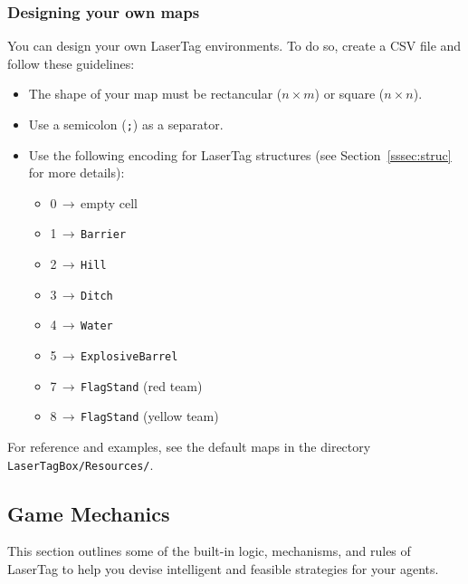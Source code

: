 \documentclass[a4paper,english,DIV=16,11pt,parskip=half,dvipsnames,listof=totoc,index=totoc,bibliography=totoc]{scrartcl}
\begin{document}
\subsubsection{Designing your own maps}
%
You can design your own LaserTag environments. To do so, create a CSV file and follow these guidelines:
%
\begin{itemize}
  \item The shape of your map must be rectancular ($n \times m$) or square ($n \times n$).
  \item Use a semicolon (\texttt{;}) as a separator.
  \item Use the following encoding for LaserTag structures (see Section~\ref{sssec:struc} for more details):
  \begin{itemize}
    \item 0$\,\to\,$empty cell
    \item 1$\,\to\,$\texttt{Barrier}
    \item 2$\,\to\,$\texttt{Hill}
    \item 3$\,\to\,$\texttt{Ditch}
    \item 4$\,\to\,$\texttt{Water}
    \item 5$\,\to\,$\texttt{ExplosiveBarrel}
    \item 7$\,\to\,$\texttt{FlagStand} (red team)
    \item 8$\,\to\,$\texttt{FlagStand} (yellow team)
  \end{itemize}
\end{itemize}

%
For reference and examples, see the default maps in the directory \texttt{LaserTagBox/Resources/}.
%
\subsection{Game Mechanics} \label{ssec:gameMechs}
%
This section outlines some of the built-in logic, mechanisms, and rules of LaserTag to help you devise intelligent and feasible strategies for your agents.
%
\end{document}
